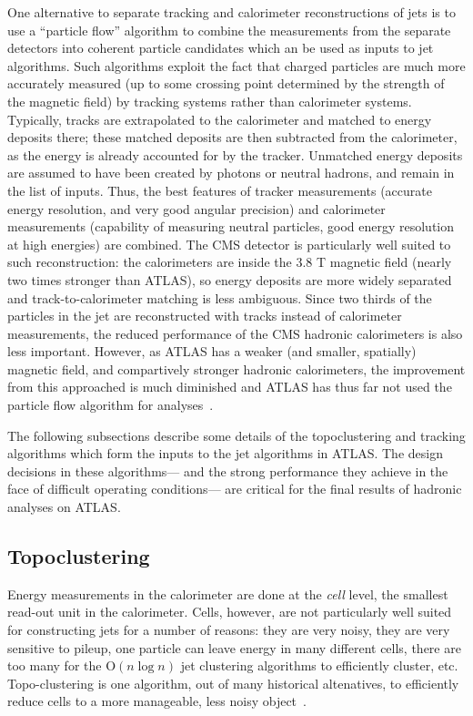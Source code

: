 One alternative to separate tracking and calorimeter reconstructions of jets is to use a ``particle flow'' algorithm to combine the measurements from the separate detectors into coherent particle candidates which an be used as inputs to jet algorithms. Such algorithms exploit the fact that charged particles are much more accurately measured (up to some crossing point determined by the strength of the magnetic field) by tracking systems rather than calorimeter systems. Typically, tracks are extrapolated to the calorimeter and matched to energy deposits there; these matched deposits are then subtracted from the calorimeter, as the energy is already accounted for by the tracker. Unmatched energy deposits are assumed to have been created by photons or neutral hadrons, and remain in the list of inputs. Thus, the best features of tracker measurements (accurate energy resolution, and very good angular precision) and calorimeter measurements (capability of measuring neutral particles, good energy resolution at high energies) are combined. The CMS detector is particularly well suited to such reconstruction: the calorimeters are inside the 3.8 T magnetic field (nearly two times stronger than ATLAS), so energy deposits are more widely separated and track-to-calorimeter matching is less ambiguous. Since two thirds of the particles in the jet are reconstructed with tracks instead of calorimeter measurements, the reduced performance of the CMS hadronic calorimeters is also less important. However, as ATLAS has a weaker (and smaller, spatially) magnetic field, and compartively stronger hadronic calorimeters, the improvement from this approached is much diminished and ATLAS has thus far not used the particle flow algorithm for analyses~\cite{CMSPFlow}.

The following subsections describe some details of the topoclustering and tracking algorithms which form the inputs to the jet algorithms in ATLAS. The design decisions in these algorithms--- and the strong performance they achieve in the face of difficult operating conditions--- are critical for the final results of hadronic analyses on ATLAS.

\subsection{Topoclustering}
\label{jet-reconstruction:jet-inputs:topoclustering}

Energy measurements in the calorimeter are done at the \textit{cell} level, the smallest read-out unit in the calorimeter. Cells, however, are not particularly well suited for constructing jets for a number of reasons: they are very noisy, they are very sensitive to pileup, one particle can leave energy in many different cells,  there are too many for the $\mathrm{O}( n \log n)$ jet clustering algorithms to efficiently cluster, etc. Topo-clustering is one algorithm, out of many historical altenatives, to efficiently reduce cells to a more manageable, less noisy object~\cite{JES2010,JES2011,Loch:1967028}.

